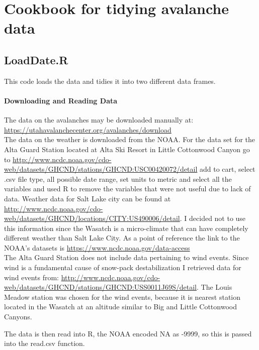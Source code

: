 \documentclass[12pt]{article}
\begin{document}
\section*{Cookbook for tidying avalanche data}
\subsection*{LoadDate.R}
This code loads the data and tidies it into two different data frames.
\paragraph*{Downloading and Reading Data}
The data on the avalanches may be downloaded manually at:\\ \url{https://utahavalanchecenter.org/avalanches/download}\\

The data on the weather is downloaded from the NOAA.  For the data set for the Alta Guard Station located at Alta Ski Resort in Little Cottonwood Canyon go to \url{http://www.ncdc.noaa.gov/cdo-web/datasets/GHCND/stations/GHCND:USC00420072/detail} add to cart, select .csv file type, all possible date range, set units to metric and select all the variables and used R to remove the variables that were not useful due to lack of data.  Weather data for Salt Lake city can be found at \url{http://www.ncdc.noaa.gov/cdo-web/datasets/GHCND/locations/CITY:US490006/detail}.  I decided not to use this information since the Wasatch is a micro-climate that can have completely different weather than Salt Lake City.  As a point of reference the link to the NOAA's datasets is \url{https://www.ncdc.noaa.gov/data-access}\\

The Alta Guard Station does not include data pertaining to wind events.  Since wind is a fundamental cause of snow-pack destabilization I retrieved data for wind events from: \url{http://www.ncdc.noaa.gov/cdo-web/datasets/GHCND/stations/GHCND:USS0011J69S/detail}.  The Louis Meadow station was chosen for the wind events, because it is nearest station located in the Wasatch at an altitude similar to Big and Little Cottonwood Canyons.

The data is then read into R, the NOAA encoded NA as -9999, so this is passed into the read.csv function.
\end{document}
